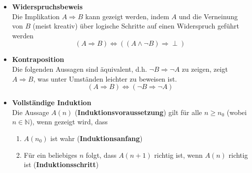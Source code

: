\documentclass{article}
\begin{document}
\begin{itemize}
	\item \textbf{Widerspruchsbeweis}\\
	Die Implikation $A\Rightarrow B$ kann gezeigt werden, indem $A$ und die Verneinung von $B$ (meist kreativ) über logische Schritte auf einen Widerspruch geführt werden
		\begin{equation}
			(A\Rightarrow B) \Leftrightarrow ((A\wedge \neg B) \Rightarrow \perp)
		\end{equation}

	\item \textbf{Kontraposition}\\
	Die folgenden Aussagen sind äquivalent, d.h. $\neg B \Rightarrow \neg A$ zu zeigen, zeigt $A\Rightarrow B$, was unter Umständen leichter zu beweisen ist.
		\begin{equation}
			(A\Rightarrow B) \Leftrightarrow (\neg B \Rightarrow \neg A)
		\end{equation}

	\item \textbf{Vollständige Induktion}\\
	Die Aussage $A(n)$ (\textbf{Induktionsvoraussetzung}) gilt für alle $n\geq n_0$ (wobei $n\in\mathbb{N}$), wenn gezeigt wird, dass
		\begin{enumerate}
			\setlength{\itemsep}{0cm}
			\item $A(n_0)$ ist wahr (\textbf{Induktionsanfang})
			\item Für ein beliebiges $n$ folgt, dass $A(n+1)$ richtig ist, wenn $A(n)$ richtig ist (\textbf{Induktionsschritt})
		\end{enumerate}
\end{itemize}


\newpage
\end{document}
